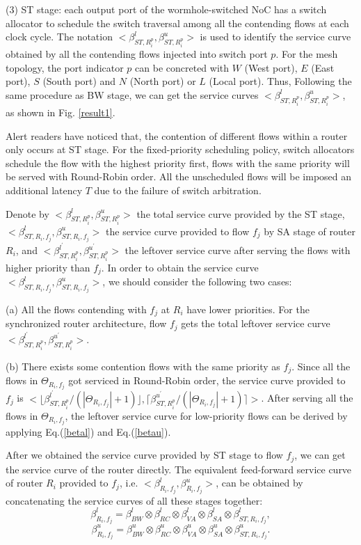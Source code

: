 \documentclass[preprint]{elsarticle}
\begin{document}
(3) ST stage: each output port of the wormhole-switched NoC has a switch allocator to schedule the switch traversal among all the contending flows at each clock cycle. The notation $<\beta_{ST,R_i^{p}}^l,\beta_{ST,R_i^{p}}^u>$ is used to identify the service curve obtained by all the contending flows injected into switch port $p$. For the mesh topology, the port indicator $p$ can be concreted with $W$ (West port), $E$ (East port), $S$ (South port) and $N$ (North port) or $L$ (Local port). Thus, Following the same procedure as BW stage, we can get the service curves $<\beta_{ST,R_i^{p}}^l,\beta_{ST,R_i^{p}}^u>$, as shown in Fig. \ref{result1}.

Alert readers have noticed that, the contention of different flows within a router only occurs at ST stage. For the fixed-priority scheduling policy, switch allocators schedule the flow with the highest priority first, flows with the same priority will be served with Round-Robin order. All the unscheduled flows will be imposed an additional latency $T$ due to the failure of switch arbitration.

Denote by $<\beta_{ST,R_i^{p}}^l,\beta_{ST,R_i^{p}}^u>$ the total service curve provided by the ST stage, $<\beta_{ST,R_i,f_j}^l,\beta_{ST,R_i,f_j}^u>$ the service curve provided to flow $f_j$ by SA stage of router $R_i$, and $<\beta_{ST,R_i^{p}}^{l^\prime},\beta_{ST,R_i^{p}}^{u^\prime}>$ the leftover service curve after serving the flows with higher priority than $f_j$. In order to obtain the service curve $<\beta_{ST,R_i,f_j}^l,\beta_{ST,R_i,f_j}^u>$, we should consider the following two cases:

(a) All the flows contending with $f_j$ at $R_i$ have lower priorities. For the synchronized router architecture, flow $f_j$ gets the total leftover service curve $<\beta_{ST,R_i^{p}}^{l^\prime},\beta_{ST,R_i^{p}}^{u^\prime}>$.

(b) There exists some contention flows with the same priority as $f_j$. Since all the flows in $\Theta_{R_i,f_j}$ got serviced in Round-Robin order, the service curve provided to $f_j$ is $<\lfloor\beta^{l^\prime}_{ST,R_i^{p}}/(|\Theta_{R_i,f_j}|+1)\rfloor,\lceil\beta^{u^\prime}_{ST,R_i^{p}}/(|\Theta_{R_i,f_j}|+1)\rceil>$. After serving all the flows in $\Theta_{R_i,f_j}$, the leftover service curve for low-priority flows can be derived by applying Eq.(\ref{betal}) and Eq.(\ref{betau}).

After we obtained the service curve provided by ST stage to flow $f_j$, we can get the service curve of the router directly. The equivalent feed-forward service curve of router $R_i$ provided to $f_j$, i.e. $<\beta_{R_i,f_j}^l,\beta_{R_i,f_j}^u>$, can be obtained by concatenating the service curves of all these stages together:
$$\beta_{R_i,f_j}^l=\beta_{BW}^l\otimes\beta_{RC}^l\otimes\beta_{VA}^l\otimes\beta_{SA}^l\otimes \beta_{ST,R_i,f_j}^l,$$
$$\beta_{R_i,f_j}^u=\beta_{BW}^u\otimes\beta_{RC}^u\otimes\beta_{VA}^u\otimes\beta_{SA}^u\otimes \beta_{ST,R_i,f_j}^u.$$
\end{document}
